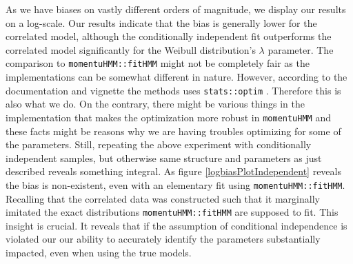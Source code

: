 As we have biases on vastly different orders of magnitude, we display our results on a log-scale. Our results indicate that the bias is generally lower for the correlated model, although the conditionally independent fit outperforms the correlated model significantly for the Weibull distribution's $\lambda$ parameter. The comparison to \texttt{momentuHMM::fitHMM} might not be completely fair as the implementations can be somewhat different in nature. However, according to the documentation and vignette \cite{momentuHMM} the methods uses \texttt{stats::optim} \cite{RLang}. Therefore this is also what we do. On the contrary, there might be various things in the implementation that makes the optimization more robust in \texttt{momentuHMM}  and these facts might be reasons why we are having troubles optimizing for some of the parameters. Still, repeating the above experiment with conditionally independent samples, but otherwise same structure and parameters as just described reveals something integral. As figure \ref{logbiasPlotIndependent} reveals the bias is non-existent, even with an elementary fit using \texttt{momentuHMM::fitHMM}. Recalling that the correlated data was constructed such that it marginally imitated the exact distributions \texttt{momentuHMM::fitHMM} are supposed to fit. This insight is crucial. It reveals that if the assumption of conditional independence is violated our our ability to accurately identify the parameters substantially impacted, even when using the true models.
